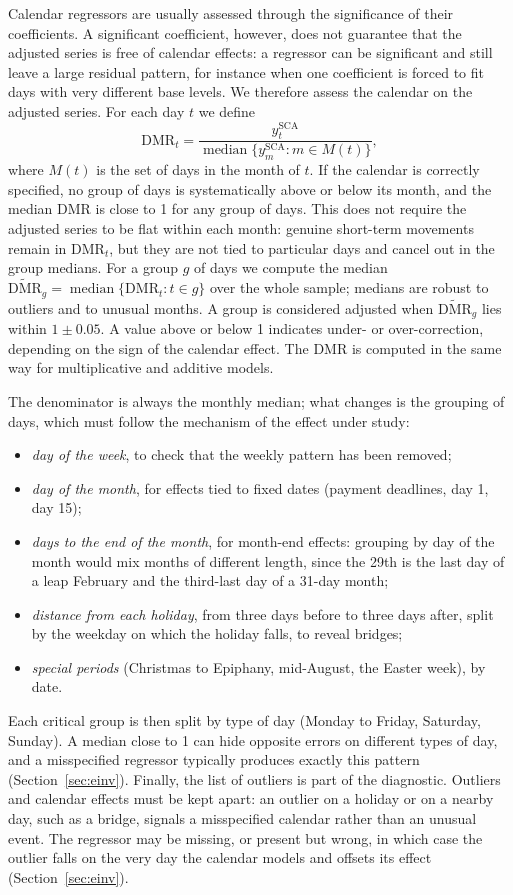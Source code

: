 \documentclass[Afour, times]{sagej}
\newcommand{\SACA}{y^{\mathrm{SCA}}}
\newcommand{\DMR}{\mathrm{DMR}}
\begin{document}
Calendar regressors are usually assessed through the significance of their coefficients. A significant coefficient, however, does not guarantee that the adjusted series is free of calendar effects: a regressor can be significant and still leave a large residual pattern, for instance when one coefficient is forced to fit days with very different base levels. We therefore assess the calendar on the adjusted series. For each day $t$ we define
\begin{equation}
\DMR_t = \frac{\SACA_t}{\operatorname{median}\{\SACA_m : m \in M(t)\}}, \label{eq:dmr}
\end{equation}
where $M(t)$ is the set of days in the month of $t$. If the calendar is correctly specified, no group of days is systematically above or below its month, and the median DMR is close to 1 for any group of days. This does not require the adjusted series to be flat within each month: genuine short-term movements remain in $\DMR_t$, but they are not tied to particular days and cancel out in the group medians. For a group $g$ of days we compute the median $\widetilde{\DMR}_g = \operatorname{median}\{\DMR_t : t \in g\}$ over the whole sample; medians are robust to outliers and to unusual months. A group is considered adjusted when $\widetilde{\DMR}_g$ lies within $1 \pm 0.05$. A value above or below 1 indicates under- or over-correction, depending on the sign of the calendar effect. The DMR is computed in the same way for multiplicative and additive models.

The denominator is always the monthly median; what changes is the grouping of days, which must follow the mechanism of the effect under study:
\begin{itemize}
\item \emph{day of the week}, to check that the weekly pattern has been removed;
\item \emph{day of the month}, for effects tied to fixed dates (payment deadlines, day 1, day 15);
\item \emph{days to the end of the month}, for month-end effects: grouping by day of the month would mix months of different length, since the 29th is the last day of a leap February and the third-last day of a 31-day month;
\item \emph{distance from each holiday}, from three days before to three days after, split by the weekday on which the holiday falls, to reveal bridges;
\item \emph{special periods} (Christmas to Epiphany, mid-August, the Easter week), by date.
\end{itemize}
Each critical group is then split by type of day (Monday to Friday, Saturday, Sunday). A median close to 1 can hide opposite errors on different types of day, and a misspecified regressor typically produces exactly this pattern (Section~\ref{sec:einv}). Finally, the list of outliers is part of the diagnostic. Outliers and calendar effects must be kept apart: an outlier on a holiday or on a nearby day, such as a bridge, signals a misspecified calendar rather than an unusual event. The regressor may be missing, or present but wrong, in which case the outlier falls on the very day the calendar models and offsets its effect (Section~\ref{sec:einv}).
\end{document}

